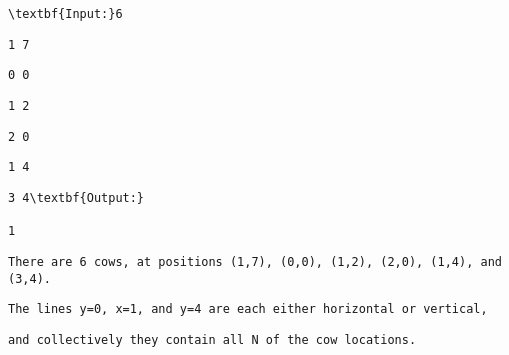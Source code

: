 \begin{verbatim}
\textbf{Input:}6 \end{verbatim}
\begin{verbatim}
1 7 \end{verbatim}
\begin{verbatim}
0 0 \end{verbatim}
\begin{verbatim}
1 2 \end{verbatim}
\begin{verbatim}
2 0 \end{verbatim}
\begin{verbatim}
1 4 \end{verbatim}
\begin{verbatim}
3 4\textbf{Output:}

1

\end{verbatim}
\begin{verbatim}
There are 6 cows, at positions (1,7), (0,0), (1,2), (2,0), (1,4), and (3,4).\end{verbatim}
\begin{verbatim}
The lines y=0, x=1, and y=4 are each either horizontal or vertical, \end{verbatim}
\begin{verbatim}
and collectively they contain all N of the cow locations.\end{verbatim}